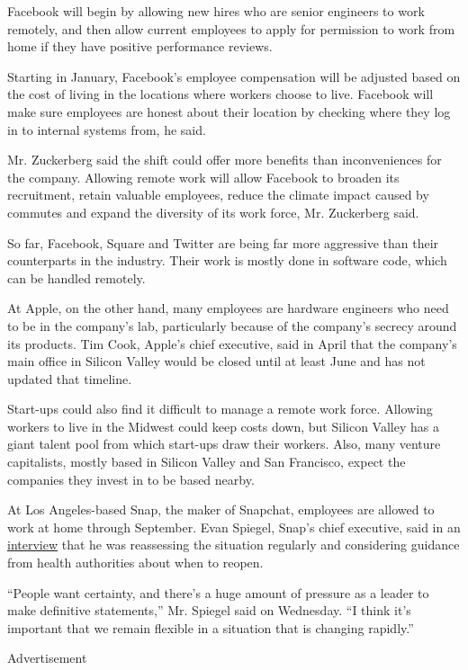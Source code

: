 Facebook will begin by allowing new hires who are senior engineers to
work remotely, and then allow current employees to apply for permission
to work from home if they have positive performance reviews.

Starting in January, Facebook's employee compensation will be adjusted
based on the cost of living in the locations where workers choose to
live. Facebook will make sure employees are honest about their location
by checking where they log in to internal systems from, he said.

Mr. Zuckerberg said the shift could offer more benefits than
inconveniences for the company. Allowing remote work will allow Facebook
to broaden its recruitment, retain valuable employees, reduce the
climate impact caused by commutes and expand the diversity of its work
force, Mr. Zuckerberg said.

So far, Facebook, Square and Twitter are being far more aggressive than
their counterparts in the industry. Their work is mostly done in
software code, which can be handled remotely.

At Apple, on the other hand, many employees are hardware engineers who
need to be in the company's lab, particularly because of the company's
secrecy around its products. Tim Cook, Apple's chief executive, said in
April that the company's main office in Silicon Valley would be closed
until at least June and has not updated that timeline.

Start-ups could also find it difficult to manage a remote work force.
Allowing workers to live in the Midwest could keep costs down, but
Silicon Valley has a giant talent pool from which start-ups draw their
workers. Also, many venture capitalists, mostly based in Silicon Valley
and San Francisco, expect the companies they invest in to be based
nearby.

At Los Angeles-based Snap, the maker of Snapchat, employees are allowed
to work at home through September. Evan Spiegel, Snap's chief executive,
said in an
\href{https://www.nytimes3xbfgragh.onion/2020/05/21/technology/robot-deliveries.html}{interview}
that he was reassessing the situation regularly and considering guidance
from health authorities about when to reopen.

``People want certainty, and there's a huge amount of pressure as a
leader to make definitive statements,'' Mr. Spiegel said on Wednesday.
``I think it's important that we remain flexible in a situation that is
changing rapidly.''

Advertisement

